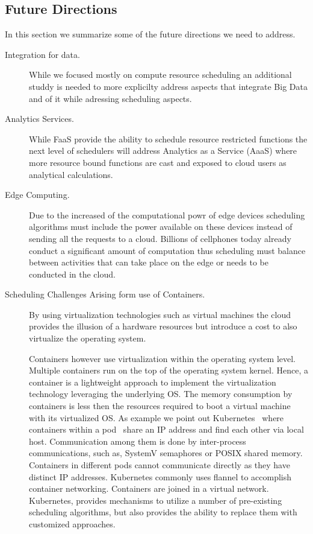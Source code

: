 \documentclass[final,5p,times,twocolumn]{elsarticle}
\begin{document}
\subsection{Future Directions}

In this section we summarize some of the future directions we need to
address.

\begin{description}

\item[Integration for data.] While we focused mostly on compute
  resource scheduling an additional studdy is needed to more
  explicilty address aspects that integrate Big Data and of it while
  adressing scheduling aspects.

\item[Analytics Services.] While FaaS provide the ability to schedule
  resource restricted functions the next level of schedulers will
  address Analytics as a Service (AaaS) where more resource bound
  functions are cast and exposed to cloud users as analytical calculations.
  
\item[Edge Computing.] Due to the increased of the computational powr
  of edge devices scheduling algorithms must include the power
  available on these devices instead of sending all the requests to a
  cloud. Billions of cellphones today already conduct a significant
  amount of computation thus scheduling must balance between
  activities that can take place on the edge or needs to be conducted
  in the cloud.

\item[Scheduling Challenges Arising form use of Containers.] By using
  virtualization technologies such as virtual machines the cloud
  provides the illusion of a hardware resources but introduce a cost
  to also virtualize the operating system.


  Containers however use
  virtualization within the operating system level. Multiple
  containers run on the top of the operating system kernel. Hence, a
  container is a lightweight approach to implement the virtualization
  technology leveraging the underlying OS. The memory consumption by
  containers is less then the resources required to boot a virtual
  machine with its virtualized OS. As example we point out
  Kubernetes~\cite{Kuber2018} where containers within a
  pod~\cite{Kubernates2018} share an IP address and find each other
  via local host. Communication among them is done by inter-process
  communications, such as, SystemV semaphores or POSIX shared
  memory. Containers in different pods cannot communicate directly as
  they have distinct IP addresses. Kubernetes commonly uses flannel to
  accomplish container networking. Containers are joined in a virtual
  network. Kubernetes, provides mechanisms to utilize a number of
  pre-existing scheduling algorithms, but also provides the ability to
  replace them with customized approaches.


\end{description}
\end{document}
